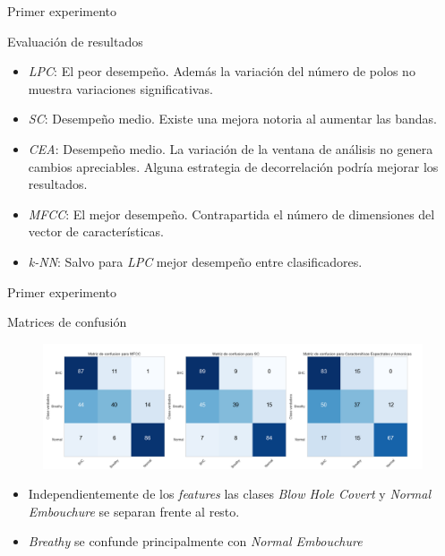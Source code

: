 \documentclass[aspectratio=169]{beamer}
\begin{document}
\begin{frame}{Primer experimento}
\begin{block}{Evaluación de resultados}
\begin{itemize}
\item \textit{LPC}: El peor desempeño. Además la variación del número de polos no muestra variaciones significativas.
\item \textit{SC}: Desempeño medio. Existe una mejora notoria al aumentar las bandas.
\item \textit{CEA}: Desempeño medio. La variación de la ventana de análisis no genera cambios apreciables. Alguna estrategia de decorrelación podría mejorar los resultados.
\item \textit{MFCC}: El mejor desempeño. Contrapartida el número de dimensiones del vector de características.
\item \textit{k-NN}: Salvo para \textit{LPC} mejor desempeño entre clasificadores.
\end{itemize}
\end{block}
\end{frame}

\begin{frame}{Primer experimento}
\begin{block}{Matrices de confusión}
\begin{figure}[H]
\begin{center}
\includegraphics[width=1\textwidth]{exp1_confusion} 
\end{center}
\end{figure}
\begin{itemize}
\item Independientemente de los \textit{features} las clases \textit{Blow Hole Covert} y \textit{Normal Embouchure} se separan frente al resto.
\item \textit{Breathy} se confunde principalmente con \textit{Normal Embouchure}
\end{itemize}
\end{block}
\end{frame}
\end{document}
